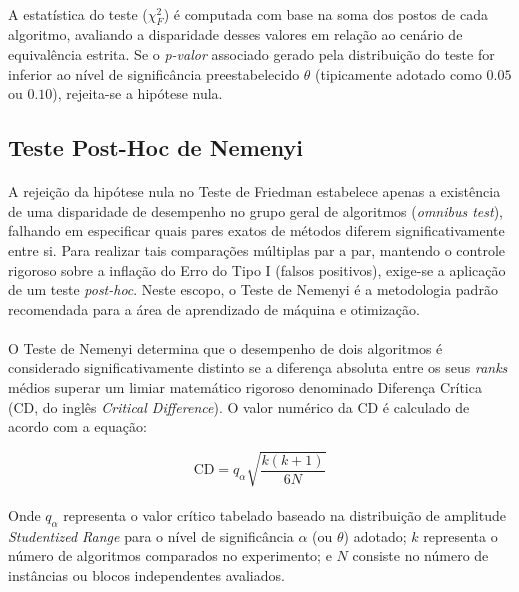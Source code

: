 \paragraph{} A estatística do teste ($\chi^2_F$) é computada com base na soma dos postos de cada algoritmo, avaliando a disparidade desses valores em relação ao cenário de equivalência estrita. Se o \textit{p-valor} associado gerado pela distribuição do teste for inferior ao nível de significância preestabelecido $\theta$ (tipicamente adotado como $0.05$ ou $0.10$), rejeita-se a hipótese nula.

\subsection{Teste Post-Hoc de Nemenyi}

\paragraph{} A rejeição da hipótese nula no Teste de Friedman estabelece apenas a existência de uma disparidade de desempenho no grupo geral de algoritmos (\textit{omnibus test}), falhando em especificar quais pares exatos de métodos diferem significativamente entre si. Para realizar tais comparações múltiplas par a par, mantendo o controle rigoroso sobre a inflação do Erro do Tipo I (falsos positivos), exige-se a aplicação de um teste \textit{post-hoc}. Neste escopo, o Teste de Nemenyi é a metodologia padrão recomendada para a área de aprendizado de máquina e otimização.

\paragraph{} O Teste de Nemenyi determina que o desempenho de dois algoritmos é considerado significativamente distinto se a diferença absoluta entre os seus \textit{ranks} médios superar um limiar matemático rigoroso denominado Diferença Crítica (CD, do inglês \textit{Critical Difference}). O valor numérico da CD é calculado de acordo com a equação:

$$\text{CD} = q_\alpha \sqrt{\frac{k(k + 1)}{6N}}$$

\paragraph{} Onde $q_\alpha$ representa o valor crítico tabelado baseado na distribuição de amplitude \textit{Studentized Range} para o nível de significância $\alpha$ (ou $\theta$) adotado; $k$ representa o número de algoritmos comparados no experimento; e $N$ consiste no número de instâncias ou blocos independentes avaliados.


